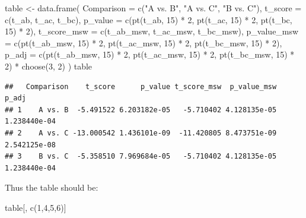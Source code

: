 \documentclass[
]{article}
\newenvironment{Shaded}{\begin{snugshade}}{\end{snugshade}}
\newcommand{\AttributeTok}[1]{\textcolor[rgb]{0.77,0.63,0.00}{#1}}
\newcommand{\DecValTok}[1]{\textcolor[rgb]{0.00,0.00,0.81}{#1}}
\newcommand{\FunctionTok}[1]{\textcolor[rgb]{0.00,0.00,0.00}{#1}}
\newcommand{\NormalTok}[1]{#1}
\newcommand{\OtherTok}[1]{\textcolor[rgb]{0.56,0.35,0.01}{#1}}
\newcommand{\SpecialCharTok}[1]{\textcolor[rgb]{0.00,0.00,0.00}{#1}}
\newcommand{\StringTok}[1]{\textcolor[rgb]{0.31,0.60,0.02}{#1}}
\begin{document}
\begin{Shaded}
\begin{Highlighting}[]
\NormalTok{table }\OtherTok{\textless{}{-}} \FunctionTok{data.frame}\NormalTok{(}
  \AttributeTok{Comparison =} \FunctionTok{c}\NormalTok{(}\StringTok{"A vs. B"}\NormalTok{, }\StringTok{"A vs. C"}\NormalTok{, }\StringTok{"B vs. C"}\NormalTok{),}
  \AttributeTok{t\_score =} \FunctionTok{c}\NormalTok{(t\_ab, t\_ac, t\_bc),}
  \AttributeTok{p\_value =} \FunctionTok{c}\NormalTok{(}\FunctionTok{pt}\NormalTok{(t\_ab, }\DecValTok{15}\NormalTok{) }\SpecialCharTok{*} \DecValTok{2}\NormalTok{, }\FunctionTok{pt}\NormalTok{(t\_ac, }\DecValTok{15}\NormalTok{) }\SpecialCharTok{*} \DecValTok{2}\NormalTok{, }\FunctionTok{pt}\NormalTok{(t\_bc, }\DecValTok{15}\NormalTok{) }\SpecialCharTok{*} \DecValTok{2}\NormalTok{),}
  \AttributeTok{t\_score\_msw =} \FunctionTok{c}\NormalTok{(t\_ab\_msw, t\_ac\_msw, t\_bc\_msw),}
  \AttributeTok{p\_value\_msw =} \FunctionTok{c}\NormalTok{(}\FunctionTok{pt}\NormalTok{(t\_ab\_msw, }\DecValTok{15}\NormalTok{) }\SpecialCharTok{*} \DecValTok{2}\NormalTok{, }\FunctionTok{pt}\NormalTok{(t\_ac\_msw, }\DecValTok{15}\NormalTok{) }\SpecialCharTok{*} \DecValTok{2}\NormalTok{, }\FunctionTok{pt}\NormalTok{(t\_bc\_msw, }\DecValTok{15}\NormalTok{) }\SpecialCharTok{*} \DecValTok{2}\NormalTok{),}
  \AttributeTok{p\_adj =} \FunctionTok{c}\NormalTok{(}\FunctionTok{pt}\NormalTok{(t\_ab\_msw, }\DecValTok{15}\NormalTok{) }\SpecialCharTok{*} \DecValTok{2}\NormalTok{, }\FunctionTok{pt}\NormalTok{(t\_ac\_msw, }\DecValTok{15}\NormalTok{) }\SpecialCharTok{*} \DecValTok{2}\NormalTok{, }\FunctionTok{pt}\NormalTok{(t\_bc\_msw, }\DecValTok{15}\NormalTok{) }\SpecialCharTok{*} \DecValTok{2}\NormalTok{) }\SpecialCharTok{*} \FunctionTok{choose}\NormalTok{(}\DecValTok{3}\NormalTok{, }\DecValTok{2}\NormalTok{)}
\NormalTok{)}
\NormalTok{table}
\end{Highlighting}
\end{Shaded}

\begin{verbatim}
##   Comparison    t_score      p_value t_score_msw  p_value_msw        p_adj
## 1    A vs. B  -5.491522 6.203182e-05   -5.710402 4.128135e-05 1.238440e-04
## 2    A vs. C -13.000542 1.436101e-09  -11.420805 8.473751e-09 2.542125e-08
## 3    B vs. C  -5.358510 7.969684e-05   -5.710402 4.128135e-05 1.238440e-04
\end{verbatim}

Thus the table should be:

\begin{Shaded}
\begin{Highlighting}[]
\NormalTok{table[, }\FunctionTok{c}\NormalTok{(}\DecValTok{1}\NormalTok{,}\DecValTok{4}\NormalTok{,}\DecValTok{5}\NormalTok{,}\DecValTok{6}\NormalTok{)]}
\end{Highlighting}
\end{Shaded}
\end{document}

